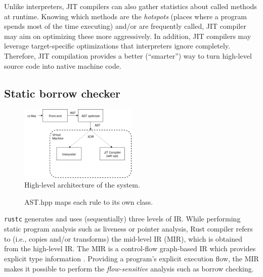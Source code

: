 Unlike interpreters, JIT compilers can also gather statistics about
called methods at runtime. Knowing which methods are the \textit{hotspots} (places
where a program spends most of the time executing) and/or are frequently called,
JIT compiler may aim on optimizing these more aggressively. In addition,
JIT compilers may leverage target-specific optimizations that interpreters 
ignore completely. Therefore, JIT compilation provides a better (``smarter'')
way to turn high-level source code into native machine code.

%

\subsection{Static borrow checker}
{%
\begin{figure}
        \includegraphics[width=0.5\textwidth]{architecture.png}
    \caption{High-level architecture of the system.}
    \label{arch1}
\end{figure}
}
\begin{figure}[ht]
    \begin{center}
        
    \end{center}
    \caption{AST.hpp maps each rule to its own class.}
    \label{cpp1}
\end{figure}

\texttt{rustc} generates and uses (sequentially) three levels of IR. While
performing static program analysis such as liveness or pointer analysis, Rust
compiler refers to (i.e., copies and/or transforms) the mid-level IR (MIR),
which is obtained from the high-level IR. The MIR is a control-flow graph-based
IR which provides explicit type information \cite{rustmir}. Providing a
program's explicit execution flow, the MIR makes it possible to perform the
\textit{flow-sensitive} analysis such as borrow checking.

